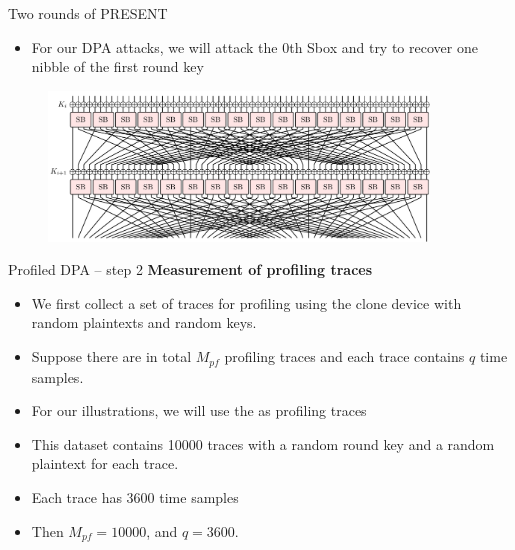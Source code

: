\begin{frame}{Two rounds of PRESENT}
    \begin{itemize}
        \item For our DPA attacks, we will attack the $0$th Sbox and try to recover one nibble of the first round key
    \end{itemize}
    \begin{figure}
    \centering
    \includegraphics[width=0.9\textwidth]{fig/PRESENT_two_rounds.pdf}
\end{figure}
\end{frame}

\begin{frame}{Profiled DPA -- step 2}
    \textbf{Measurement of profiling traces}
    \begin{itemize}
        \item We first collect a set of traces for profiling using the clone device with random plaintexts and random keys.
        \item Suppose there are in total $M_{pf}$ profiling traces and each trace contains $q$ time samples.
    \end{itemize}
    \begin{example}
    \begin{itemize}
        \item  For our illustrations, we will use the \datarantwo as profiling traces
        \item This dataset contains 10000 traces with a random round key and a random plaintext for each trace.
        \item Each trace has $3600$ time samples
        \item Then $M_{pf}=10000$, and $q=3600$.
    \end{itemize}
    \end{example}
\end{frame}

